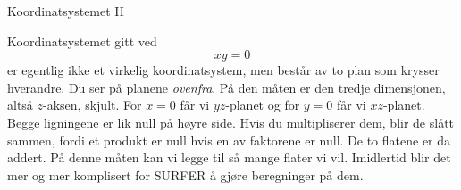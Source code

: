 \documentclass[no]{./../../common/SurferDesc}%
\begin{document}
\footnotesize
%

\begin{surferPage}
  \begin{surferTitle}Koordinatsystemet II\end{surferTitle}
   \begin{surferText}
   
Koordinatsystemet gitt ved 
\[xy=0\]
er egentlig ikke et virkelig koordinatsystem, men består av to plan som krysser hverandre. Du ser på planene {\it ovenfra}. På den måten er den tredje dimensjonen, altså $z$-aksen, skjult. 
\vspace{0.3cm}
For $x=0$ får vi $yz$-planet og for $y=0$ får vi $xz$-planet. Begge ligningene er lik null på høyre side. 
Hvis du multipliserer dem, blir de slått sammen, fordi et produkt er null hvis en av faktorene er null.
 De to flatene er da addert. På denne måten kan vi legge til så mange flater vi vil. 
 Imidlertid blir det mer og mer komplisert for SURFER å gjøre beregninger på dem.
\end{surferText}
\end{surferPage}
\end{document}
